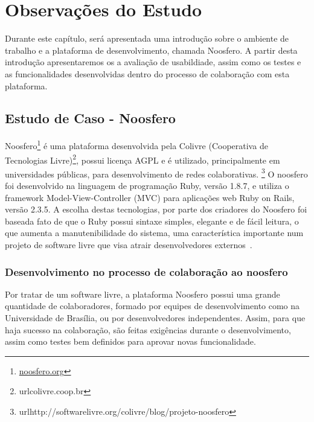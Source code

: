 \chapter{Observações do Estudo}

Durante este capítulo, será apresentada uma introdução sobre o ambiente de trabalho e a plataforma de desenvolvimento, chamada Noosfero. A partir desta introdução apresentaremos os a avaliação de usabildiade, assim como os testes e as funcionalidades desenvolvidas dentro do processo de colaboração com esta plataforma.

\section{Estudo de Caso - Noosfero}

Noosfero\footnote{\url{noosfero.org}} é uma plataforma desenvolvida pela Colivre (Cooperativa de Tecnologias Livre)\footnote{url{colivre.coop.br}}, possui licença AGPL e é utilizado, principalmente em universidades públicas, para desenvolvimento de redes colaborativas. \footnote{url{http://softwarelivre.org/colivre/blog/projeto-noosfero}}
%
O noosfero foi desenvolvido na linguagem de programação Ruby, versão 1.8.7, e utiliza
o framework Model-View-Controller (MVC) para aplicações web Ruby on Rails, versão 
2.3.5. A escolha destas tecnologias, por parte dos criadores do Noosfero foi baseada 
fato de que o Ruby possui sintaxe simples, elegante e de fácil leitura, o que aumenta
a manutenibilidade do sistema, uma característica importante num projeto de software
livre que visa atrair desenvolvedores externos~\cite{meirelles2013}.

\subsection{Desenvolvimento no processo de colaboração ao noosfero}

Por tratar de um software livre, a plataforma Noosfero possui uma grande quantidade 
de colaboradores, formado por equipes de desenvolvimento como na Universidade de 
Brasília, ou por desenvolvedores independentes. Assim, para que haja sucesso na 
colaboração, são feitas exigências durante o desenvolvimento, assim como testes 
bem definidos para aprovar novas funcionalidade.

